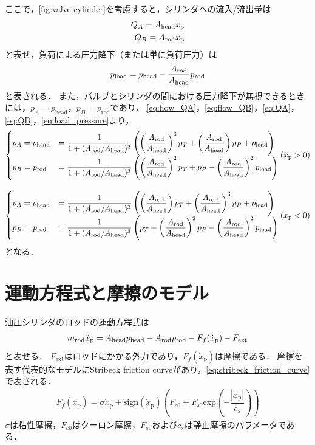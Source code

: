 ここで，\figname\ref{fig:valve-cylinder}を考慮すると，シリンダへの流入/流出量は
\begin{align}
    \label{eq:QA}
    Q_A = A_\mathrm{head} \dot{x}_\mathrm{p}\\
    \label{eq:QB}
    Q_B = A_\mathrm{rod} \dot{x}_\mathrm{p}
\end{align}
と表せ，負荷による圧力降下（または単に負荷圧力）は
\begin{align}
    \label{eq:load_pressure}
    p_\mathrm{load} = p_\mathrm{head} - \frac{A_\mathrm{rod}}{A_\mathrm{head}}p_\mathrm{rod}
\end{align}
と表される．
また，バルブとシリンダの間における圧力降下が無視できるときには，$p_A = p_\mathrm{head}$，$p_B = p_\mathrm{rod}$であり，
\eqnname\eqref{eq:flow_QA}，\eqnname\eqref{eq:flow_QB}，\eqnname\eqref{eq:QA}，\eqnname\eqref{eq:QB}，\eqnname\eqref{eq:load_pressure}より，
\begin{align}
    \label{eq:papb-xp_plus}
    \begin{cases}
    p_A = p_\mathrm{head} &= \dfrac{1}{1+(A_\mathrm{rod}/A_\mathrm{head})^3}\left( \left(\dfrac{A_\mathrm{rod}}{A_\mathrm{head}}\right)^3p_T + \left(\dfrac{A_\mathrm{rod}}{A_\mathrm{head}}\right)p_P  + p_\mathrm{load}\right) \\
    p_B = p_\mathrm{rod} &= \dfrac{1}{1+(A_\mathrm{rod}/A_\mathrm{head})^3}\left( \left(\dfrac{A_\mathrm{rod}}{A_\mathrm{head}}\right)^2p_T + p_P  - \left(\dfrac{A_\mathrm{rod}}{A_\mathrm{head}}\right)^2p_\mathrm{load}\right)
    \end{cases}
    (\dot{x}_\mathrm{p} > 0)\\[10pt]
    \label{eq:papb-xp_minus}
    \begin{cases}
    p_A = p_\mathrm{head} &= \dfrac{1}{1+(A_\mathrm{rod}/A_\mathrm{head})^3}\left( \left(\dfrac{A_\mathrm{rod}}{A_\mathrm{head}}\right)p_T + \left(\dfrac{A_\mathrm{rod}}{A_\mathrm{head}}\right)^3p_P  + p_\mathrm{load}\right) \\
    p_B = p_\mathrm{rod} &= \dfrac{1}{1+(A_\mathrm{rod}/A_\mathrm{head})^3}\left( p_T + \left(\dfrac{A_\mathrm{rod}}{A_\mathrm{head}}\right)^2p_P  - \left(\dfrac{A_\mathrm{rod}}{A_\mathrm{head}}\right)^2p_\mathrm{load}\right)
    \end{cases}
    (\dot{x}_\mathrm{p} < 0)
\end{align}
となる．

\section{運動方程式と摩擦のモデル}
油圧シリンダのロッドの運動方程式は
\begin{align}
    \label{eq:eom_of_rod}
    m_\mathrm{rod}\ddot{x}_\mathrm{p} =A_\mathrm{head} p_\mathrm{head} - A_\mathrm{rod} p_\mathrm{rod} - F_f(\dot{x}_\mathrm{p}) -F_\mathrm{ext}
\end{align}
と表せる．
$F_\mathrm{ext}$はロッドにかかる外力であり，$F_f(\dot{x}_\mathrm{p})$は摩擦である．
摩擦を表す代表的なモデルにStribeck friction curveがあり，\eqnname\eqref{eq:stribeck_friction_curve}で表される．
\begin{align}
    \label{eq:stribeck_friction_curve}
    F_f(\dot{x}_\mathrm{p}) = \sigma \dot{x}_\mathrm{p} + \mathrm{sign}(\dot{x}_\mathrm{p}) \left( F_{c0} + F_{s0} \mathrm{exp}\left( -\dfrac{|\dot{x}_\mathrm{p}|}{c_s} \right) \right)
\end{align}
$\sigma$は粘性摩擦，$F_{c0}$はクーロン摩擦，$F_{s0}$および$c_s$は静止摩擦のパラメータである．


